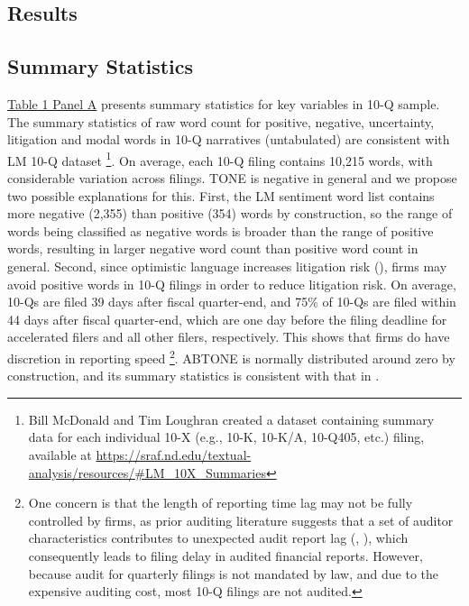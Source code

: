 \documentclass[a4paper]{article}
\begin{document}
\begin{spacing}{2}
\section{Results}
\subsection{Summary Statistics}
\hyperref[T1PA]{Table 1 Panel A} presents summary statistics for key variables in 10-Q sample. The summary statistics of raw word count for positive, negative, uncertainty, litigation and modal words in 10-Q narratives (untabulated) are consistent with LM 10-Q dataset \footnote{Bill McDonald and Tim Loughran created a dataset containing summary data for each individual 10-X (e.g., 10-K, 10-K/A, 10-Q405, etc.) filing, available at \url{https://sraf.nd.edu/textual-analysis/resources/\#LM_10X_Summaries}}. On average, each 10-Q filing contains 10,215 words, with considerable variation across filings. TONE is negative in general and we propose two possible explanations for this. First, the LM sentiment word list contains more negative (2,355) than positive (354) words by construction, so the range of words being classified as negative words is broader than the range of positive words, resulting in larger negative word count than positive word count in general. Second, since optimistic language increases litigation risk (\cite{rogersDisclosureToneShareholder2011}), firms may avoid positive words in 10-Q filings in order to reduce litigation risk. On average, 10-Qs are filed 39 days after fiscal quarter-end, and 75\% of 10-Qs are filed within 44 days after fiscal quarter-end, which are one day before the filing deadline for accelerated filers and all other filers, respectively. This shows that firms do have discretion in reporting speed \footnote{One concern is that the length of reporting time lag may not be fully controlled by firms, as prior auditing literature suggests that a set of auditor characteristics contributes to unexpected audit report lag (\cite{knechelAdditionalEvidenceAudit2001}, \cite{bamberAuditStructureOther1993}), which consequently leads to filing delay in audited financial reports. However, because audit for quarterly filings is not mandated by law, and due to the expensive auditing cost, most 10-Q filings are not audited.}. ABTONE is normally distributed around zero by construction, and its summary statistics is consistent with that in \cite{huangToneManagement2014}.


\end{spacing}
\end{document}
